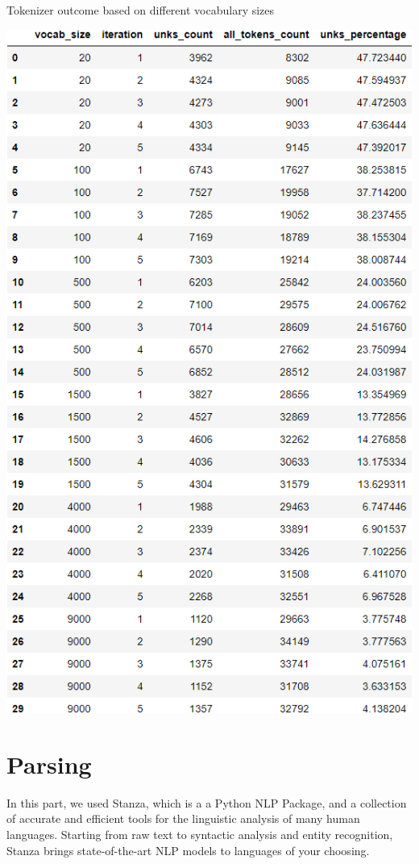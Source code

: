 \documentclass[12pt, a4paper]{article}
\begin{document}
\begin{table}[H]
	\caption{Tokenizer outcome based on different vocabulary sizes} 
	\centering 
	\vspace{5mm} 
	\includegraphics[width=\linewidth]{../reports/images/token_vocab-size.png}
	\label{table:token_vocab-size} 
\end{table}



\newpage
\part{Parsing}
In this part, we used Stanza, which is a a Python NLP Package, and a collection of accurate and efficient tools for the linguistic analysis of many human languages. Starting from raw text to syntactic analysis and entity recognition, Stanza brings state-of-the-art NLP models to languages of your choosing.
\end{document}
